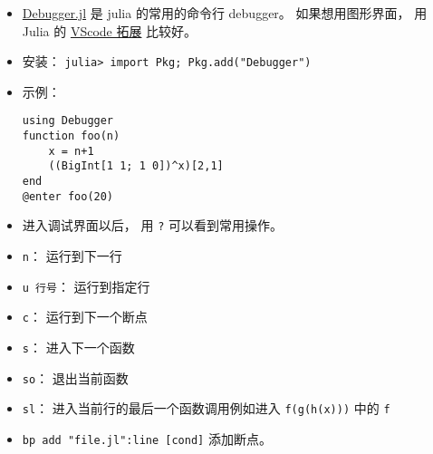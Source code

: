
\begin{issues}
\issueDraft
\end{issues}

\begin{itemize}
\item \href{https://github.com/JuliaDebug/Debugger.jl}{Debugger.jl} 是 julia 的常用的命令行 debugger。 如果想用图形界面， 用 Julia 的 \href{https://www.julia-vscode.org}{VScode 拓展} 比较好。
\item 安装： \verb|julia> import Pkg; Pkg.add("Debugger")|
\item 示例：
\begin{lstlisting}[language=none]
using Debugger
function foo(n)
    x = n+1
    ((BigInt[1 1; 1 0])^x)[2,1]
end
@enter foo(20)
\end{lstlisting}
\item 进入调试界面以后， 用 \verb|?| 可以看到常用操作。
\item \verb|n|： 运行到下一行
\item \verb|u 行号|： 运行到指定行
\item \verb|c|： 运行到下一个断点
\item \verb|s|： 进入下一个函数
\item \verb|so|： 退出当前函数
\item \verb|sl|： 进入当前行的最后一个函数调用例如进入 \verb|f(g(h(x)))| 中的 \verb|f|
\item \verb|bp add "file.jl":line [cond]| 添加断点。
\end{itemize}
